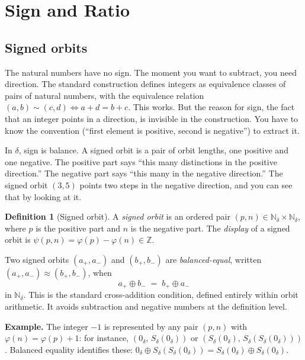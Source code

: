 \documentclass[11pt,a4paper]{article}
\theoremstyle{definition}
\newtheorem{definition}[theorem]{Definition}
\theoremstyle{remark}
\begin{document}
\section{Sign and Ratio}\label{sec:sign}

\subsection{Signed orbits}

The natural numbers have no sign. The moment you want to subtract, you need
direction. The standard construction defines integers as equivalence classes
of pairs of natural numbers, with the equivalence relation
$(a,b) \sim (c,d) \Leftrightarrow a+d = b+c$. This works. But the reason
for sign, the fact that an integer points in a direction, is invisible in
the construction. You have to know the convention (``first element is
positive, second is negative'') to extract it.

In $\delta$, sign is balance. A signed orbit is a pair of orbit lengths, one
positive and one negative. The positive part says ``this many distinctions
in the positive direction.'' The negative part says ``this many in the
negative direction.'' The signed orbit $(3, 5)$ points two steps in the
negative direction, and you can see that by looking at it.

\begin{definition}[Signed orbit]\label{def:signedorbit}
A \emph{signed orbit} is an ordered pair $(p, n) \in \mathbb{N}_\delta \times
\mathbb{N}_\delta$, where $p$ is the positive part and $n$ is the negative
part. The \emph{display} of a signed orbit is $\psi(p,n) = \varphi(p) -
\varphi(n) \in \mathbb{Z}$.

Two signed orbits $(a_+, a_-)$ and $(b_+, b_-)$ are \emph{balanced-equal},
written $(a_+, a_-) \approx (b_+, b_-)$, when
\[
  a_+ \oplus b_- \;=\; b_+ \oplus a_-
\]
in $\mathbb{N}_\delta$. This is the standard cross-addition condition, defined
entirely within orbit arithmetic. It avoids subtraction and negative numbers at
the definition level.
\end{definition}

\noindent\textbf{Example.} The integer $-1$ is represented by any pair
$(p,n)$ with $\varphi(n) = \varphi(p) + 1$: for instance,
$(0_\delta,\, S_\delta(0_\delta))$ or
$(S_\delta(0_\delta),\, S_\delta(S_\delta(0_\delta)))$. Balanced equality
identifies these: $0_\delta \oplus S_\delta(S_\delta(0_\delta))
= S_\delta(0_\delta) \oplus S_\delta(0_\delta)$.
\end{document}
